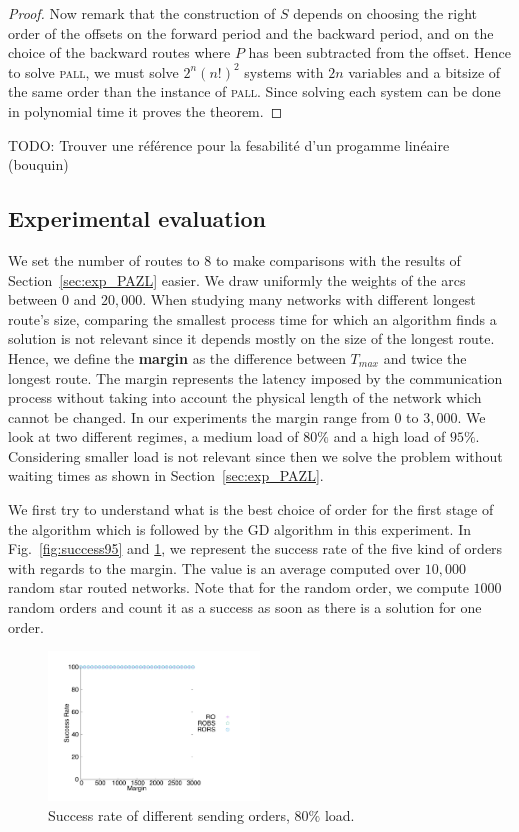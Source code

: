 \documentclass[10pt, conference, letterpaper]{IEEEtran}
\newcommand{\todo}[1]{{\color{red} TODO: {#1}}}
\newcommand\pall{\textsc{pall}\xspace}
\begin{document}
\begin{proof}
Now remark that the construction of $S$ depends on choosing the right order of the offsets on the forward period and the backward period, and on the choice of the backward routes where $P$ has been subtracted from the offset. Hence to solve \pall, we must solve $2^n(n!)^2$ systems with $2n$ variables and a bitsize of the same order than the instance of \pall. Since solving each system can be done in polynomial time it proves the theorem.
\end{proof}

\todo{Trouver une référence pour la fesabilité d'un progamme linéaire (bouquin)}
    \subsection{Experimental evaluation}
    \label{sec:resultsPALL}
    
    We set the number of routes to $8$ to make comparisons with the results of Section~\ref{sec:exp_PAZL} easier. 
    We draw uniformly the weights of the arcs between $0$ and $20,000$. When studying many networks with different longest route's size, comparing the smallest process time for which an algorithm finds a solution is not relevant since it depends mostly on the size of the longest route. Hence, we define the {\bf margin} as the difference between $T_{max}$ and twice the longest route. The margin represents the latency imposed by the communication process without taking into account the physical length of the network which cannot be changed. In our experiments the margin range from  $0$ to $3,000$.
   We look at two different regimes, a medium load of $80\%$ and a high load of $95\%$.
   Considering smaller load is not relevant since then we solve the problem without waiting times as shown in Section~\ref{sec:exp_PAZL}. 
   
   We first try to understand what is the best choice of order for the first stage of the algorithm which is followed by the GD algorithm in this experiment. In Fig.~\ref{fig:success95} and \ref{fig:success80}, we represent the success rate of the five kind of orders with regards to the margin. The value is an average computed over $10,000$ random star routed networks.  Note that for the random order, we compute $1000$ random orders and count it as a success as soon as there is a solution for one order. 

\begin{figure}[h] 
  \centering
          \includegraphics[width=0.5\textwidth]{departs_gp_25000.pdf}
      \caption{Success rate of different sending orders, $80\%$ load.}
           \label{fig:success80}
     \end{figure}
     
\end{document}
